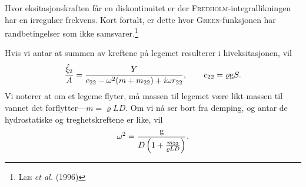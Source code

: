 Hvor eksitasjonskraften får en diskontinuitet er der \textsc{Fredholm}-integrallikningen har en irregulær frekvens.
Kort fortalt, er dette hvor \textsc{Green}-funksjonen har randbetingelser som ikke samsvarer.\footnote{\cite{lee1996extended} \textsc{Lee} \emph{et al.} (1996)}

\vspace{2em}
Hvis vi antar at summen av kreftene på legemet resulterer i hiveksitasjonen, vil
\[
        \frac{\hat{\xi}_2}{A} = \frac{Y}{c_{22} - \omega^2(m + m_{22}) + i \omega r_{22}}, \qquad c_{22} = \varrho\mathrm{g} S.
\]
Vi noterer at om et legeme flyter, må massen til legemet være likt massen til vannet det forflytter---$m = \varrho L D$.
Om vi nå ser bort fra demping, og antar de hydrostatiske og treghetskreftene er like, vil
\[
        \omega^2 = \frac{\mathrm{g}}{D \left( 1 + \frac{m_{22}}{\varrho L D} \right)}.
\]
